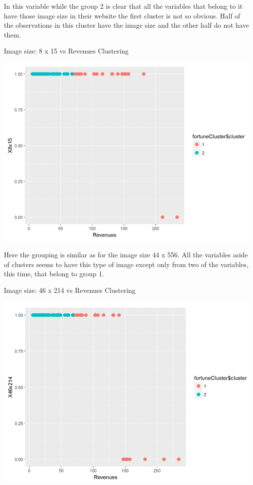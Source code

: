 \documentclass{book}
\begin{document}
In this variable while the group 2 is clear that all the variables that belong to it have those image size in their website the first cluster is not so obvious. Half of the observations in this cluster have the image size and the other half do not have them.
\begin{table}[H]
\centering
\caption{Image size: 8 x 15  vs Revenues Clustering}
\begin{center}
\includegraphics[scale=0.5]{../R/photos/99_clust_8x15.png}   \\
\end{center}
\end{table}
Here the grouping is similar as for the image size 44 x 556. All the variables aside of clusters seems to have this type of image except only from two of the variables, this time, that belong to group 1.
\begin{table}[H]
\centering
\caption{Image size: 46 x 214  vs Revenues Clustering}
\begin{center}
\includegraphics[scale=0.5]{../R/photos/95_clust_46x214_new.png}   \\
\end{center}
\end{table}
\end{document}
